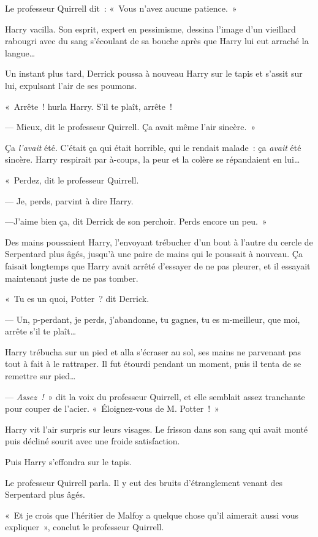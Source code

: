 Le professeur Quirrell dit~: «~Vous n'avez aucune patience.~»

Harry vacilla.
Son esprit, expert en pessimisme, dessina l'image d'un vieillard rabougri avec du sang s'écoulant de sa bouche après que Harry lui eut arraché la langue…

Un instant plus tard, Derrick poussa à nouveau Harry sur le tapis et s'assit sur lui, expulsant l'air de ses poumons.

«~Arrête~! hurla Harry.
S'il te plaît, arrête~!

--- Mieux, dit le professeur Quirrell.
Ça avait même l'air sincère.~»

Ça \emph{l'avait} été.
C'était ça qui était horrible, qui le rendait malade~: ça \emph{avait} été sincère.
Harry respirait par à-coups, la peur et la colère se répandaient en lui…

«~Perdez, dit le professeur Quirrell.

--- Je, perds, parvint à dire Harry.

---J'aime bien ça, dit Derrick de son perchoir.
Perds encore un peu.~»

\later

Des mains poussaient Harry, l'envoyant trébucher d'un bout à l'autre du cercle de Serpentard plus âgés, jusqu'à une paire de mains qui le poussait à nouveau.
Ça faisait longtemps que Harry avait arrêté d'essayer de ne pas pleurer, et il essayait maintenant juste de ne pas tomber.

«~Tu es un quoi, Potter~? dit Derrick.

--- Un, p-perdant, je perds, j'abandonne, tu gagnes, tu es m-meilleur, que moi, arrête s'il te plaît…

Harry trébucha sur un pied et alla s'écraser au sol, ses mains ne parvenant pas tout à fait à le rattraper.
Il fut étourdi pendant un moment, puis il tenta de se remettre sur pied…

--- \emph{Assez~!}~» dit la voix du professeur Quirrell, et elle semblait assez tranchante pour couper de l'acier.
«~Éloignez-vous de M. Potter~!~»

Harry vit l'air surpris sur leurs visages.
Le frisson dans son sang qui avait monté puis décliné sourit avec une froide satisfaction.

Puis Harry s'effondra sur le tapis.

Le professeur Quirrell parla.
Il y eut des bruits d'étranglement venant des Serpentard plus âgés.

«~Et je crois que l'héritier de Malfoy a quelque chose qu'il aimerait aussi vous expliquer~», conclut le professeur Quirrell.

